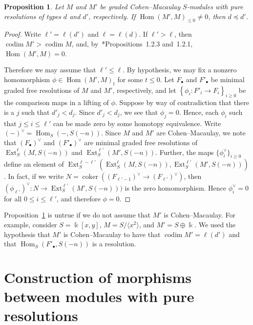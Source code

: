 \documentclass[12pt]{amsart}
\newtheorem{prop}[equation]{Proposition}
\theoremstyle{definition}
\newcommand{\codim}{\operatorname{codim}}
\newcommand{\coker}{\operatorname{coker}}
\newcommand{\Ext}{\operatorname{Ext}} %
\newcommand{\Hom}{\operatorname{Hom}}
\begin{document}
\begin{prop}\label{prop:half:poset:deg}
Let $M$ and $M'$ be graded Cohen--Macaulay $S$-modules 
with pure resolutions of types $d$ and $d'$, respectively. 
If $\Hom(M',M)_{\leq 0}\ne 0$, then $d\preceq d'$.
\end{prop}
%
\begin{proof}
Write $\ell' = \ell(d')$ and $\ell = \ell(d)$.  If $\ell' > \ell$, then
$\codim M' > \codim M$, and, by~\cite{BrHe:CM}*{Propositions~1.2.3
and~1.2.1}, $\Hom(M', M) = 0$.

Therefore we may assume that $\ell' \leq \ell$. 
By hypothesis, we may fix a nonzero homomorphism 
$\phi \in \Hom(M',M)_t$ for some $t\leq 0$. 
Let $F_\bullet$ and $F'_\bullet$ be minimal graded free resolutions of $M$
and $M'$, respectively, and let $\left\{ \phi_i\colon  F'_i \to F_i
\right\}_{i \geq 0}$ be the comparison maps in a lifting of $\phi$. 
%
Suppose by way of contradiction  that %
there is a $j$ such that $d'_j < d_j$. 
Since $d'_j < d_j$, we see that $\phi_j = 0$.  Hence,
each $\phi_i$ such that $j \leq i \leq \ell'$ can be made
zero by some homotopy equivalence.
Write $(-)^\vee = \Hom_S(-, S(-n))$.
Since $M$ and $M'$ are Cohen--Macaulay, 
we note that $(F_\bullet)^\vee$ and $(F'_\bullet)^\vee$ 
are minimal graded free resolutions of 
$\Ext^\ell_S(M,S(-n))$ and $\Ext^{\ell'}_S(M', S(-n))$. 
Further, the maps $\{\phi_i^\vee\}_{i \geq 0}$ define an element of 
$\Ext^{\ell-\ell'}_S\left(\Ext_S^\ell(M, S(-n)), \Ext_S^{\ell'}(M', S(-n))\right)$. 
In fact, if we write 
$N = \coker \left((F_{\ell'-1})^\vee \longrightarrow (F_{\ell'})^\vee\right)$, 
then $(\phi_{\ell'})^\vee \colon N \longrightarrow \Ext_S^{\ell'}(M', S(-n)))$ 
is the zero homomorphism.
Hence $\phi_i^\vee = 0$ for all $0 \leq i \leq \ell'$, and therefore $\phi = 0$.
\end{proof}

Proposition~\ref{prop:half:poset:deg} is untrue if we do not 
assume that $M'$ is Cohen--Macaulay. 
For example, consider $S = \Bbbk[x,y]$, $M = S/\langle x^2\rangle $, and
$M' = S \oplus \Bbbk$. 
We used the hypothesis that $M'$ is Cohen--Macaulay 
to have that $\codim M' = \ell(d')$ and that
$\Hom_S(F'_\bullet, S(-n))$ is a resolution. 

\section{Construction of morphisms between modules with pure resolutions}
\label{sec:construct deg}
\end{document}
